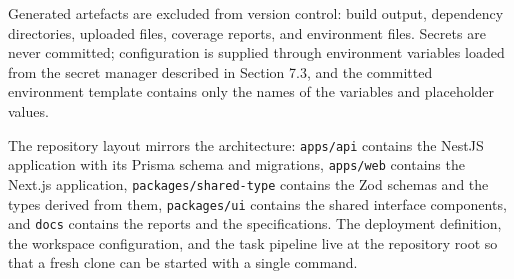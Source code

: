 Generated artefacts are excluded from version control: build output, dependency directories, uploaded files, coverage reports, and environment files. Secrets are never committed; configuration is supplied through environment variables loaded from the secret manager described in Section 7.3, and the committed environment template contains only the names of the variables and placeholder values.

The repository layout mirrors the architecture: \texttt{apps/api} contains the NestJS application with its Prisma schema and migrations, \texttt{apps/web} contains the Next.js application, \texttt{packages/shared-type} contains the Zod schemas and the types derived from them, \texttt{packages/ui} contains the shared interface components, and \texttt{docs} contains the reports and the specifications. The deployment definition, the workspace configuration, and the task pipeline live at the repository root so that a fresh clone can be started with a single command.
